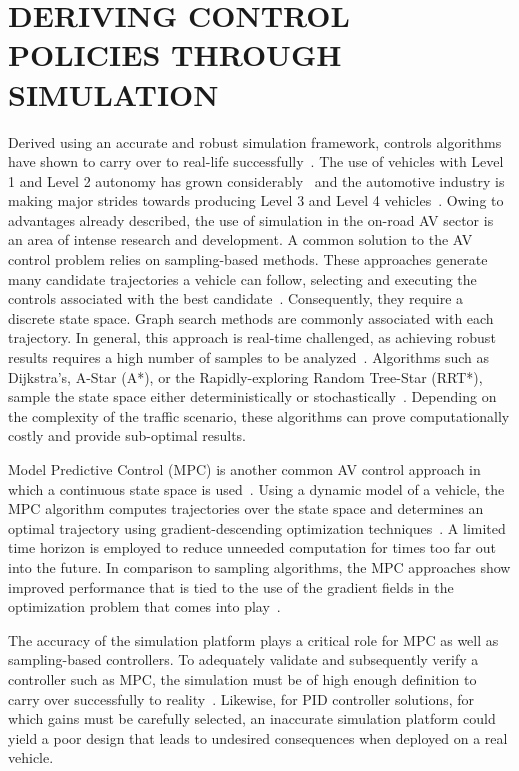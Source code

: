 \documentclass[12pt,twocolumn]{article}
\begin{document}
\section{DERIVING CONTROL POLICIES THROUGH SIMULATION}
\label{sec:ML}
Derived using an accurate and robust simulation framework, controls algorithms have shown to carry over to real-life successfully~\cite{VISTASimMITRL, VirtualToRealRL}. The use of vehicles with Level 1 and Level 2 autonomy has grown considerably~\cite{J3016_201401, SAEHardwareInTheLoop} and the automotive industry is making major strides towards producing Level 3 and Level 4 vehicles~\cite{WayveRLSimToReal, TeslaSummon}. Owing to advantages already described, the use of simulation in the on-road AV sector is an area of intense research and development. A common solution to the AV control problem relies on sampling-based methods. These approaches generate many candidate trajectories a vehicle can follow, selecting and executing the controls associated with the best candidate~\cite{UrbanAVBezierMPC, RRTRealTime}. Consequently, they require a discrete state space. Graph search methods are commonly associated with each trajectory. In general, this approach is real-time challenged, as achieving robust results requires a high number of samples to be analyzed~\cite{TrajectoryPlanningMIQP}. Algorithms such as Dijkstra's, A-Star (A*), or the Rapidly-exploring Random Tree-Star (RRT*), sample the state space either deterministically or stochastically~\cite{RRTRealTime}. Depending on the complexity of the traffic scenario, these algorithms can prove computationally costly and provide sub-optimal results.

Model Predictive Control (MPC) is another common AV control approach in which a continuous state space is used~\cite{Borrelli2005MPCbasedAT}. Using a dynamic model of a vehicle, the MPC algorithm computes trajectories over the state space and determines an optimal trajectory using gradient-descending optimization techniques~\cite{TrajectoryPlanningMIQP, Liniger2017OptimizationBasedAR}. A limited time horizon is employed to reduce unneeded computation for times too far out into the future. In comparison to sampling algorithms, the MPC approaches show improved performance that is tied to the use of the gradient fields in the optimization problem that comes into play~\cite{Borrelli2005MPCbasedAT}.

The accuracy of the simulation platform plays a critical role for MPC as well as sampling-based controllers. To adequately validate and subsequently verify a controller such as MPC, the simulation must be of high enough definition to carry over successfully to reality~\cite{AVTestingMethods}. Likewise, for PID controller solutions, for which gains must be carefully selected, an inaccurate simulation platform could yield a poor design that leads to undesired consequences when deployed on a real vehicle.
\end{document}
